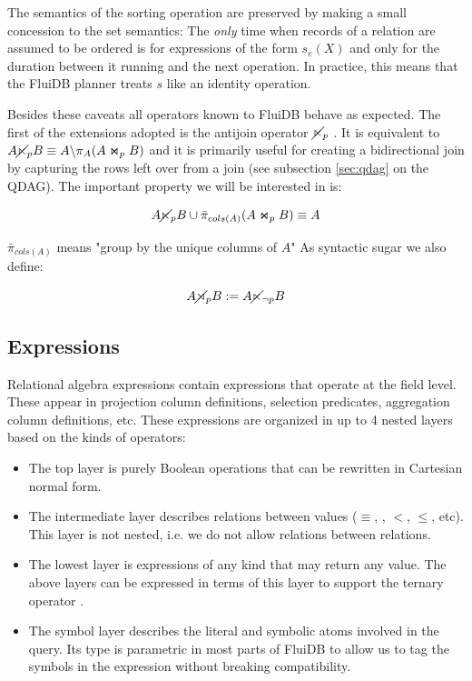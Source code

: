 The semantics of the sorting operation are preserved by making a small
concession to the set semantics: The \emph{only} time when records of a
relation are assumed to be ordered is for expressions of the form
\(s_e(X)\) and only for the duration between it running and the next
operation. In practice, this means that the FluiDB planner treats \(s\)
like an identity operation.

Besides these caveats all operators known to FluiDB behave as expected.
The first of the extensions adopted is the antijoin operator
\(\cancel\ltimes_p\) . It is equivalent to
\(A \cancel\ltimes_p B \equiv A \backslash \pi_A(A \Join_p B)\) and it is
primarily useful for creating a bidirectional join by capturing the
rows left over from a join (see subsection \ref{sec:qdag} on the
QDAG). The important property we will be interested in is:

\[
  A \cancel\ltimes_p B \cup \bar\pi_{cols(A)}(A \Join_p B) \equiv A
\]

\(\bar{\pi}_{cols(A)}\) means "group by the unique columns of \(A\)"
As syntactic sugar we also define:

\[
  A \cancel\rtimes_p B := A \cancel\ltimes_{\neg p} B
\]

\subsection{Expressions}
\label{sec:expressions_predicates}

Relational algebra expressions contain expressions that operate at the
field level. These appear in projection column definitions, selection
predicates, aggregation column definitions, etc. These expressions are
organized in up to 4 nested layers based on the kinds of operators:

\begin{itemize}
\item The top layer is purely Boolean operations  that
  can be rewritten in Cartesian normal form.
\item The intermediate layer  describes relations between values
  (\(\equiv\), , \(<\), \(\le\), etc). This layer is not
  nested, i.e. we do not allow relations between relations.
\item The lowest layer  is expressions of any kind that may
  return any value. The above layers can be expressed in terms of this
  layer to support the ternary operator .
\item The symbol layer describes the literal and symbolic atoms involved in the query.
  Its type is parametric in most parts of FluiDB to allow
  us to tag the symbols in the expression without breaking compatibility.
\end{itemize}

